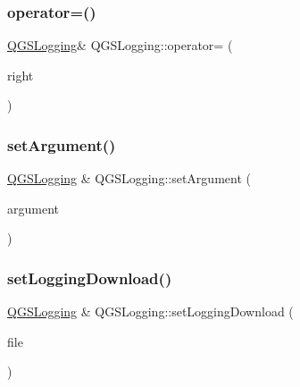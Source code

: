 \subsubsection{\texorpdfstring{operator=()}{operator=()}\hspace{0.1cm}{\footnotesize\ttfamily [2/2]}}
{\footnotesize\ttfamily \mbox{\hyperlink{class_q_g_s_logging}{Q\+G\+S\+Logging}}\& Q\+G\+S\+Logging\+::operator= (\begin{DoxyParamCaption}\item[{\mbox{\hyperlink{class_q_g_s_logging}{Q\+G\+S\+Logging}} \&\&}]{right }\end{DoxyParamCaption})\hspace{0.3cm}{\ttfamily [default]}}

\mbox{\label{class_q_g_s_logging_a54c4e2c0b4cfaa12aca4d4666ae9ce67}} 
\subsubsection{\texorpdfstring{set\+Argument()}{setArgument()}}
{\footnotesize\ttfamily \mbox{\hyperlink{class_q_g_s_logging}{Q\+G\+S\+Logging}} \& Q\+G\+S\+Logging\+::set\+Argument (\begin{DoxyParamCaption}\item[{const Q\+String \&}]{argument }\end{DoxyParamCaption})}

\mbox{\label{class_q_g_s_logging_a82a76579905dd61f630056a054fff577}} 
\subsubsection{\texorpdfstring{set\+Logging\+Download()}{setLoggingDownload()}}
{\footnotesize\ttfamily \mbox{\hyperlink{class_q_g_s_logging}{Q\+G\+S\+Logging}} \& Q\+G\+S\+Logging\+::set\+Logging\+Download (\begin{DoxyParamCaption}\item[{const \mbox{\hyperlink{class_q_g_s_logging_1_1_q_g_s_logging_download}{Q\+G\+S\+Logging\+Download}} \&}]{file }\end{DoxyParamCaption})}


